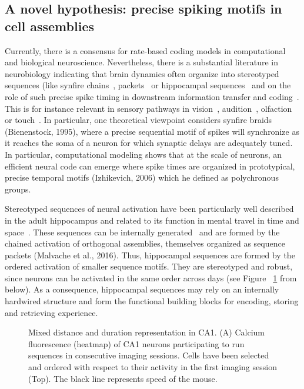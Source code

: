 \documentclass[brainsci, %
               review,submit,pdftex,moreauthors%
               ]{Definitions/mdpi}
\begin{document}
\subsection{A novel hypothesis: precise spiking motifs in cell assemblies}
%
Currently, there is a consensus for rate-based coding models in computational and biological neuroscience. Nevertheless, there is a substantial literature in neurobiology indicating that brain dynamics often organize into stereotyped sequences (like synfire chains~\citep{ikegaya_synfire_2004}, packets~\citep{luczak_sequential_2007} or hippocampal sequences~\citep{pastalkova_internally_2008,villette_internally_2015} and on the role of such precise spike timing in downstream information transfer and coding~\citep{villette_internally_2015,branco_dendritic_2010,luczak_packet-based_2015}. This is for instance relevant in sensory pathways in vision~\citep{meister_concerted_1995}, audition~\citep{decharms_primary_1996}, olfaction~\citep{wehr_odour_1996} or touch~\citep{johansson_first_2004}. In particular, one theoretical viewpoint considers synfire braids (Bienenstock, 1995), where a precise sequential motif of spikes will synchronize as it reaches the soma of a neuron for which synaptic delays are adequately tuned. In particular, computational modeling shows that at the scale of neurons, an efficient neural code can emerge where spike times are organized in prototypical, precise temporal motifs (Izhikevich, 2006) which he defined as polychronous groups.

Stereotyped sequences of neural activation have been particularly well described in the adult hippocampus and related to its function in mental travel in time and space~\citep{buzsaki_space_2018}. These sequences can be internally generated~\citep{pastalkova_internally_2008,villette_internally_2015} and are formed by the chained activation of orthogonal assemblies, themselves organized as sequence packets (Malvache et al., 2016). Thus, hippocampal sequences are formed by the ordered activation of smaller sequence motifs. They are stereotyped and robust, since neurons can be activated in the same order across days (see Figure
~\ref{fig:haimerl} from~\citep{haimerl_internal_2019} below). As a consequence, hippocampal sequences may rely on an internally hardwired structure and form the functional building blocks for encoding, storing and retrieving experience.

\begin{figure}
\centering
\caption{Mixed distance and duration representation in CA1. (A) Calcium fluorescence (heatmap) of CA1 neurons participating to run sequences in consecutive imaging sessions. Cells have been selected and ordered with respect to their activity in the first imaging session (Top). The black line represents speed of the mouse.}\label{fig:haimerl}
\end{figure}
\end{document}
